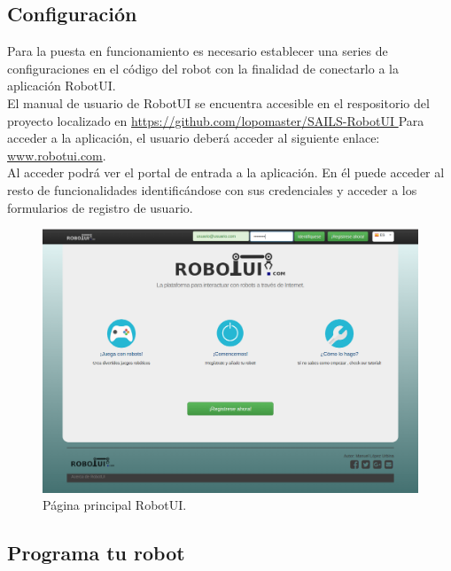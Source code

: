 \subsection{ Configuración }
\label{sec:configuracion}

Para la puesta en funcionamiento es necesario establecer una series de configuraciones en el código del robot con la finalidad de conectarlo a la aplicación RobotUI.\\

El manual de usuario de RobotUI se encuentra accesible en el respositorio del proyecto localizado en \url{ https://github.com/lopomaster/SAILS-RobotUI }
Para acceder a la aplicación, el usuario deberá acceder al siguiente enlace: \url{www.robotui.com}. \\

Al acceder podrá ver el portal de entrada a la aplicación. En él puede acceder al resto de funcionalidades identificándose con sus credenciales y acceder a los formularios de registro
de usuario.\\

\begin{figure}[H]
  \begin{center}
    \includegraphics[scale=0.3]{imagenes/manual-usuario/pagina-principal.png}
  \end{center}
  \caption{Página principal RobotUI.}
  \label{website:pagina-principal}
\end{figure}


\subsection{ Programa tu robot }
\label{sec:programacion-robot}

